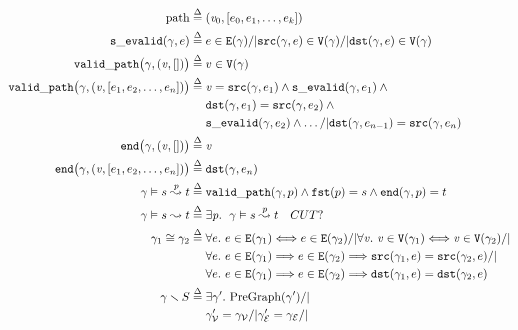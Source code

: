 \begin{figure}
	\begin{gather*}
     	\begin{aligned}
    	\mathrm{path} \; \defeq \; &(\m{v}_0, [e_0, e_1, \dots, e_k]) \\ 
    	\mathtt{s\_evalid}(\gamma, e) \; \defeq \; & e \in \mathtt{E}(\gamma) /| 
    	\mathtt{src}(\gamma,e) \in \mathtt{V}(\gamma) /| 
    	\mathtt{dst}(\gamma,e) \in \mathtt{V}(\gamma) \\
		\mathtt{valid\_path}\big(\gamma, (\m{v},[])\big) \;\defeq \; & v \in \mathtt{V}(\gamma)\\
		\mathtt{valid\_path}\big(\gamma, (\m{v},[e_1,e_2,\dots,e_n])\big) \; \defeq \; &\m{v}=\mathtt{src}(\gamma,e_1) \wedge \mathtt{s\_evalid}(\gamma,e_1) \wedge \null \\
    &\mathtt{dst}(\gamma,e_1)=\mathtt{src}(\gamma,e_2) \wedge \null\\
    &\mathtt{s\_evalid}(\gamma, e_2) \wedge \dots /| \mathtt{dst}(\gamma,e_{n-1})=\mathtt{src}(\gamma,e_n) \\ 
        \mathtt{end}\big(\gamma, (\m{v}, [])\big)\;\defeq\;& \m{v}\\
      	\mathtt{end}\big(\gamma, (\m{v},[e_1,e_2,\dots,e_n])\big)\;\defeq\;&
      	\mathtt{dst}(\gamma, e_n)\\
      	\gamma \vDash s \overset{\m{p}}{\leadsto} t \;\defeq\; &
        \mathtt{valid\_path}(\gamma, p)\wedge
        \mathtt{fst}(p)=s \wedge \mathtt{end}(\gamma,p)=t \\
        \gamma \vDash s \leadsto t \;\defeq\; &
        \exists \m{p}.~ \; \gamma \vDash s \overset{p}{\leadsto} t \quad CUT? \\  
        \gamma_1 \cong \gamma_2 \; \defeq \; & 
        	\forall e.~e \in \mathtt{E}(\gamma_1) <=> e \in \mathtt{E}(\gamma_2) /| \forall \m{v}.~\m{v} \in \mathtt{V}(\gamma_1) <=> \m{v} \in \mathtt{V}(\gamma_2) /| \null \\
        	&\forall e.~e \in \mathtt{E}(\gamma_1) ==> e \in \mathtt{E}(\gamma_2) ==> \mathtt{src}(\gamma_1, e) = \mathtt{src}(\gamma_2, e) /| \null \\ 
        	&\forall e.~e \in \mathtt{E}(\gamma_1) ==> e \in \mathtt{E}(\gamma_2) ==> \mathtt{dst}(\gamma_1, e) = \mathtt{dst}(\gamma_2, e) \\
       	\gamma \smallsetminus S \; \defeq \; & \exists \gamma'.~\mathrm{PreGraph}(\gamma') /| \null \\
       	 	& \gamma'_{\mathcal{V}} = \gamma_{\mathcal{V}}/|
       	 	\gamma'_{\mathcal{E}} = \gamma_{\mathcal{E}}/|

\end{aligned}
\end{gather*}
\end{figure}
